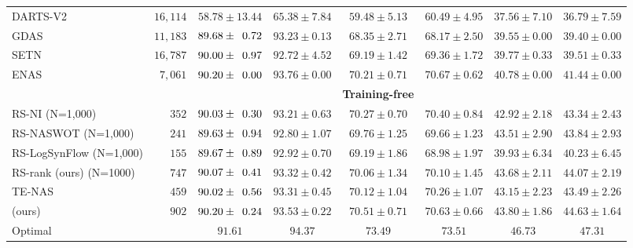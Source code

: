 \documentclass[sigconf]{acmart}
\begin{document}
\begin{table*}[htb]
\begin{tabular}{@{}lrcccccc@{}}
        DARTS-V2            & $16,114$ & $58.78 \pm 13.44$    & $65.38 \pm 7.84$ & $59.48 \pm 5.13$ & $60.49 \pm 4.95$ & $37.56 \pm 7.10$ & $36.79 \pm 7.59$ \\
        GDAS                & $11,183$ & $89.68 \pm \z{0.72}$ & $93.23 \pm 0.13$ & $68.35 \pm 2.71$ & $68.17 \pm 2.50$ & $39.55 \pm 0.00$ & $39.40 \pm 0.00$ \\
        SETN                & $16,787$ & $90.00 \pm \z{0.97}$ & $92.72 \pm 4.52$ & $69.19 \pm 1.42$ & $69.36 \pm 1.72$ & $39.77 \pm 0.33$ & $39.51 \pm 0.33$ \\
        ENAS                & $7,061$  & $90.20 \pm \z{0.00}$ & $93.76 \pm 0.00$ & $70.21 \pm 0.71$ & $70.67 \pm 0.62$ & $40.78 \pm 0.00$ & $41.44 \pm 0.00$ \\ \midrule
                            &          &                      &                  & \textbf{Training-free} &                &                  &                  \\
        RS-NI (N=1,000)         & $352$  & $90.03 \pm \z{0.30}$ & $93.21 \pm 0.63$ & $70.27 \pm 0.70$ & $70.40 \pm 0.84$ & $42.92 \pm 2.18$ & $43.34 \pm 2.43$ \\ 
        RS-NASWOT (N=1,000)     & $241$  & $89.63 \pm \z{0.94}$ & $92.80 \pm 1.07$ & $69.76 \pm 1.25$ & $69.66 \pm 1.23$ & $43.51 \pm 2.90$ & $43.84 \pm 2.93$ \\ 
        RS-LogSynFlow (N=1,000) & $155$  & $89.67 \pm \z{0.89}$ & $92.92 \pm 0.70$ & $69.19 \pm 1.86$ & $68.98 \pm 1.97$ & $39.93 \pm 6.34$ & $40.23 \pm 6.45$ \\ 
        RS-rank (ours) (N=1000) & $747$  & $90.07 \pm \z{0.41}$ & $93.32 \pm 0.42$ & $70.06 \pm 1.34$ & $70.10 \pm 1.45$ & $43.68 \pm 2.11$ & $44.07 \pm 2.19$ \\ 
        TE-NAS                  & $459$  & $90.02 \pm \z{0.56}$ & $93.31 \pm 0.45$ & $70.12 \pm 1.04$ & $70.26 \pm 1.07$ & $43.15 \pm 2.23$ & $43.49 \pm 2.26$ \\
        \palg{} (ours)          & $902$  & $90.20 \pm \z{0.24}$ & $93.53 \pm 0.22$ & $70.51 \pm 0.71$ & $70.63 \pm 0.66$ & $43.80 \pm 1.86$ & $44.63 \pm 1.64$ \\ \midrule
        Optimal                 &        & $91.61$              & $94.37$          & $73.49$          & $73.51$          & $46.73$          & $47.31$          \\ \bottomrule
        \end{tabular}
        \label{table:overall_201}
        \vspace{-\baselineskip}
    \end{table*}
\end{document}
